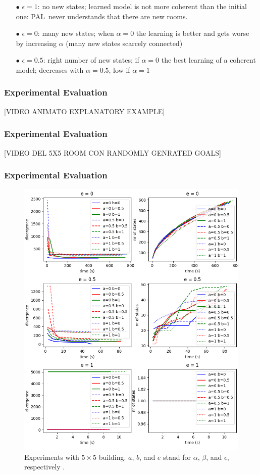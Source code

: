 \documentclass{beamer}
\def\PAL{\textsc{PAL}}
\begin{document}
\begin{frame}
\begin{itemize}
\item[$\bullet$] 
{\color {red} $\epsilon = 1$:} no new states; learned model is not more coherent than the initial one: \PAL\ never understands that there are new rooms.  
\item [$\bullet$]
{\color {red} $\epsilon = 0$:}  many new states; when $\alpha = 0$ the learning is better and  gets worse by increasing $\alpha$  (many new states
  scarcely connected)
\item [$\bullet$] 
{\color {red} $\epsilon = 0.5$:} right number of
  new states; if $\alpha = 0$ 
  the best learning of a coherent model; decreases with $\alpha=0.5$, low if $\alpha = 1$
\end{itemize}

\end{frame}

\begin{frame}
\frametitle{Experimental Evaluation}

[VIDEO ANIMATO EXPLANATORY EXAMPLE]
    
\end{frame}

\begin{frame}
\frametitle{Experimental Evaluation}

[VIDEO DEL 5X5 ROOM CON RANDOMLY GENRATED GOALS]


\end{frame}

\begin{frame}
\frametitle{Experimental Evaluation}
\vspace*{-0.5cm}
\begin{figure}
\centering
\includegraphics[width=0.7\columnwidth]{big_exp.png}
\caption{Experiments with $5\times5$ building. $a$, $b$, and $e$ stand for $\alpha$, $\beta$, and $\epsilon$, respectively \label{fig:big_experiments}.}
\end{figure}

\end{frame}
\end{document}
